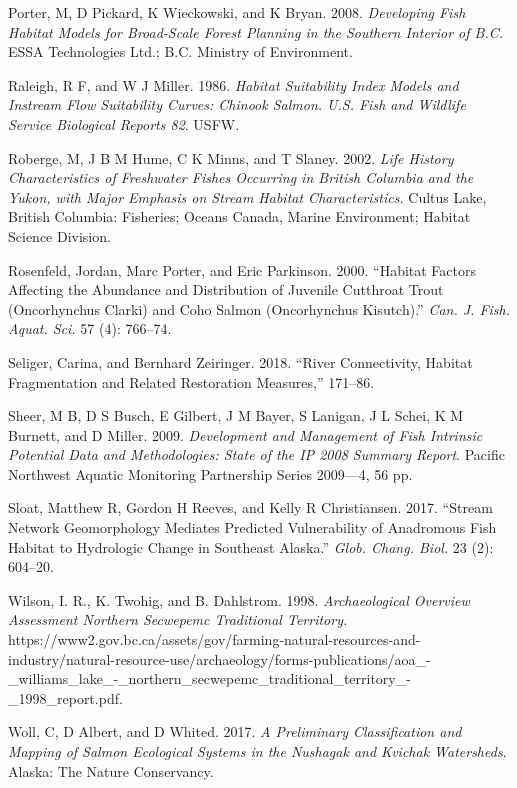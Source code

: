 \documentclass[
  letterpaper,
  DIV=11,
  numbers=noendperiod]{scrreprt}
\newlength{\cslhangindent}
\newenvironment{CSLReferences}[2] %
 {\begin{list}{}{%
  \setlength{\itemindent}{0pt}
  \setlength{\leftmargin}{0pt}
  \setlength{\parsep}{0pt}
  \ifodd #1
   \setlength{\leftmargin}{\cslhangindent}
   \setlength{\itemindent}{-1\cslhangindent}
  \fi
  \setlength{\itemsep}{#2\baselineskip}}}
 {\end{list}}
\begin{document}
\begin{CSLReferences}{1}{0}
Porter, M, D Pickard, K Wieckowski, and K Bryan. 2008. \emph{Developing
Fish Habitat Models for {Broad-Scale} Forest Planning in the Southern
Interior of {B.C}.} {ESSA} Technologies Ltd.; {B.C}. Ministry of
Environment.

Raleigh, R F, and W J Miller. 1986. \emph{Habitat Suitability Index
Models and Instream Flow Suitability Curves: Chinook Salmon. {U.S}. Fish
and Wildlife Service Biological Reports 82}. USFW.

Roberge, M, J B M Hume, C K Minns, and T Slaney. 2002. \emph{Life
History Characteristics of Freshwater Fishes Occurring in British
Columbia and the Yukon, with Major Emphasis on Stream Habitat
Characteristics.} Cultus Lake, British Columbia: Fisheries; Oceans
Canada, Marine Environment; Habitat Science Division.

Rosenfeld, Jordan, Marc Porter, and Eric Parkinson. 2000. {``Habitat
Factors Affecting the Abundance and Distribution of Juvenile Cutthroat
Trout (Oncorhynchus Clarki) and Coho Salmon (Oncorhynchus Kisutch).''}
\emph{Can. J. Fish. Aquat. Sci.} 57 (4): 766--74.

Seliger, Carina, and Bernhard Zeiringer. 2018. {``River Connectivity,
Habitat Fragmentation and Related Restoration Measures,''} 171--86.

Sheer, M B, D S Busch, E Gilbert, J M Bayer, S Lanigan, J L Schei, K M
Burnett, and D Miller. 2009. \emph{Development and Management of Fish
Intrinsic Potential Data and Methodologies: State of the {IP} 2008
Summary Report}. Pacific Northwest Aquatic Monitoring Partnership Series
2009---4, 56 pp.

Sloat, Matthew R, Gordon H Reeves, and Kelly R Christiansen. 2017.
{``Stream Network Geomorphology Mediates Predicted Vulnerability of
Anadromous Fish Habitat to Hydrologic Change in Southeast Alaska.''}
\emph{Glob. Chang. Biol.} 23 (2): 604--20.

Wilson, I. R., K. Twohig, and B. Dahlstrom. 1998. \emph{Archaeological
Overview Assessment Northern Secwepemc Traditional Territory.}
https://www2.gov.bc.ca/assets/gov/farming-natural-resources-and-industry/natural-resource-use/archaeology/forms-publications/aoa\_-\_williams\_lake\_-\_northern\_secwepemc\_traditional\_territory\_-\_1998\_report.pdf.

Woll, C, D Albert, and D Whited. 2017. \emph{A Preliminary
Classification and Mapping of Salmon Ecological Systems in the Nushagak
and Kvichak Watersheds}. Alaska: The Nature Conservancy.

\end{CSLReferences}
\end{document}
